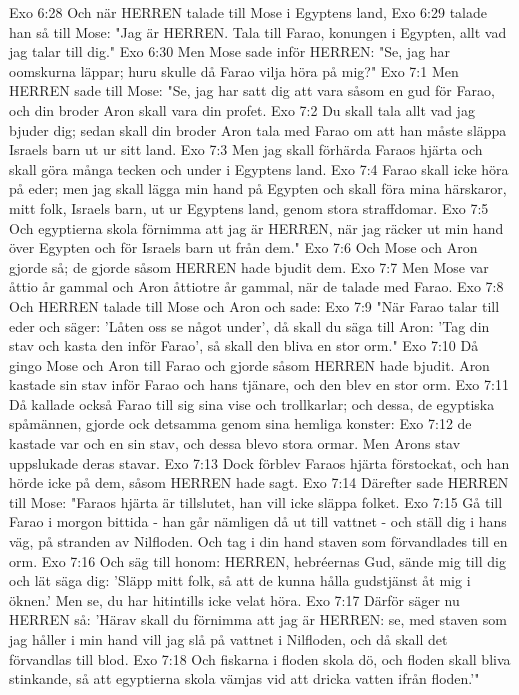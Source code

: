 Exo 6:28  Och när HERREN talade till Mose i Egyptens land,
Exo 6:29  talade han så till Mose: "Jag är HERREN. Tala till Farao, konungen i Egypten, allt vad jag talar till dig."
Exo 6:30  Men Mose sade inför HERREN: "Se, jag har oomskurna läppar; huru skulle då Farao vilja höra på mig?"
Exo 7:1  Men HERREN sade till Mose: "Se, jag har satt dig att vara såsom en gud för Farao, och din broder Aron skall vara din profet.
Exo 7:2  Du skall tala allt vad jag bjuder dig; sedan skall din broder Aron tala med Farao om att han måste släppa Israels barn ut ur sitt land.
Exo 7:3  Men jag skall förhärda Faraos hjärta och skall göra många tecken och under i Egyptens land.
Exo 7:4  Farao skall icke höra på eder; men jag skall lägga min hand på Egypten och skall föra mina härskaror, mitt folk, Israels barn, ut ur Egyptens land, genom stora straffdomar.
Exo 7:5  Och egyptierna skola förnimma att jag är HERREN, när jag räcker ut min hand över Egypten och för Israels barn ut från dem."
Exo 7:6  Och Mose och Aron gjorde så; de gjorde såsom HERREN hade bjudit dem.
Exo 7:7  Men Mose var åttio år gammal och Aron åttiotre år gammal, när de talade med Farao.
Exo 7:8  Och HERREN talade till Mose och Aron och sade:
Exo 7:9  "När Farao talar till eder och säger: 'Låten oss se något under', då skall du säga till Aron: 'Tag din stav och kasta den inför Farao', så skall den bliva en stor orm."
Exo 7:10  Då gingo Mose och Aron till Farao och gjorde såsom HERREN hade bjudit. Aron kastade sin stav inför Farao och hans tjänare, och den blev en stor orm.
Exo 7:11  Då kallade också Farao till sig sina vise och trollkarlar; och dessa, de egyptiska spåmännen, gjorde ock detsamma genom sina hemliga konster:
Exo 7:12  de kastade var och en sin stav, och dessa blevo stora ormar. Men Arons stav uppslukade deras stavar.
Exo 7:13  Dock förblev Faraos hjärta förstockat, och han hörde icke på dem, såsom HERREN hade sagt.
Exo 7:14  Därefter sade HERREN till Mose: "Faraos hjärta är tillslutet, han vill icke släppa folket.
Exo 7:15  Gå till Farao i morgon bittida - han går nämligen då ut till vattnet - och ställ dig i hans väg, på stranden av Nilfloden. Och tag i din hand staven som förvandlades till en orm.
Exo 7:16  Och säg till honom: HERREN, hebréernas Gud, sände mig till dig och lät säga dig: 'Släpp mitt folk, så att de kunna hålla gudstjänst åt mig i öknen.' Men se, du har hitintills icke velat höra.
Exo 7:17  Därför säger nu HERREN så: 'Härav skall du förnimma att jag är HERREN: se, med staven som jag håller i min hand vill jag slå på vattnet i Nilfloden, och då skall det förvandlas till blod.
Exo 7:18  Och fiskarna i floden skola dö, och floden skall bliva stinkande, så att egyptierna skola vämjas vid att dricka vatten ifrån floden.'"
